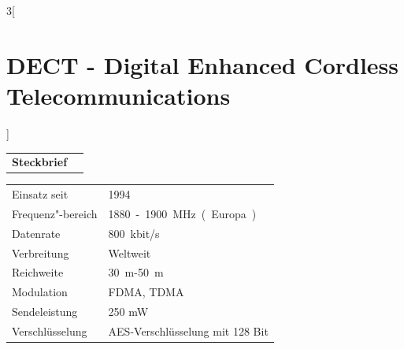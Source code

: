 \begin{multicols}{3}[\section{DECT - Digital Enhanced Cordless Telecommunications}]


\newrefsegment

\begin{tabular}{p{}p{2.7 cm}}
\textbf{Steckbrief}& \\
\end{tabular}
\begin{tabular}{p{}p{2.7 cm}}
      Einsatz seit & 1994\\
      Frequenz"-bereich  & \SI{1880}-\SI{1900}{\mega\hertz} (Europa)\\
      Datenrate & \SI{800}{kbit/s}\\
      Verbreitung & Weltweit\\
      Reichweite & \SI{30}{\metre}-\SI{50}{\metre}\\
      Modulation & FDMA, TDMA\\
      Sendeleistung & 250 mW\\
      Verschlüsselung & AES-Verschlüsselung mit 128 Bit\\
\end{tabular}
\par

\end{multicols}
